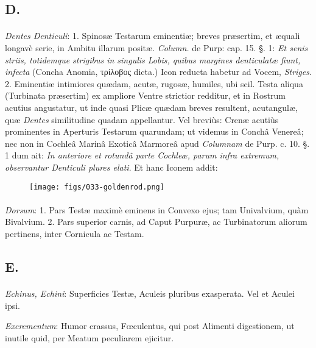\documentclass[a4paper, 11pt, oneside, polutonikogreek, german]{article}
\begin{document}
\subsection{D.}
\paragraph{}
\emph{Dentes Denticuli}: 1. Spinosæ Testarum eminentiæ; breves præsertim, et æquali longavè serie, in Ambitu illarum positæ. \emph{Column.} de Purp: cap. 15. §. 1: \emph{Et senis striis, totidemque strigibus in singulis Lobis, quibus margines denticulatæ fiunt, infecta} (Concha Anomia, τρίλοβος dicta.) Icon reducta habetur ad Vocem, \emph{Striges}. 2. Eminentiæ intimiores quædam, acutæ, rugosæ, humiles, ubi scil. Testa aliqua (Turbinata præsertim) ex ampliore Ventre strictior redditur, et in Rostrum acutius angustatur, ut inde quasi Plicæ quædam breves resultent, acutangulæ, quæ \emph{Dentes} similitudine quadam appellantur. Vel breviùs: Crenæ acutiùs prominentes in Aperturis Testarum quarundam; ut videmus in Conchâ Venereâ; nec non in Cochleâ Marinâ Exoticâ Marmoreâ apud \emph{Columnam} de Purp. c. 10. §. 1 dum ait: \emph{In anteriore et rotundâ parte Cochleæ, parum infra extremum, observantur Denticuli plures elati}. Et hanc Iconem addit:

\begin{figure}[H]
\centering
\texttt{[image: figs/033-goldenrod.png]}
\end{figure}
\paragraph{}
\emph{Dorsum}: 1. Pars Testæ maximè eminens in Convexo ejus; tam Univalvium, quàm Bivalvium. 2. Pars superior carnis, ad Caput Purpuræ, ac Turbinatorum aliorum pertinens, inter Cornicula ac Testam.

\subsection{E.}
\paragraph{}
\emph{Echinus, Echini}: Superficies Testæ, Aculeis pluribus exasperata. Vel et Aculei ipsi.

\emph{Excrementum}: Humor crassus, Fœculentus, qui post Alimenti digestionem, ut inutile quid, per Meatum peculiarem ejicitur.
\end{document}
